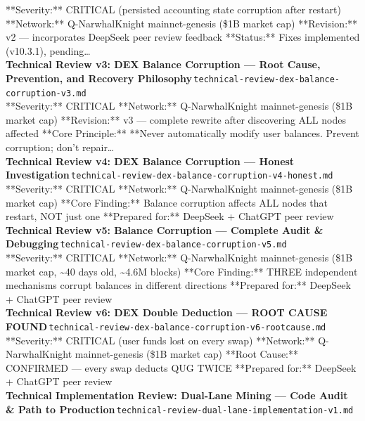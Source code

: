 \documentclass[11pt,a4paper]{article}
\begin{document}
**Severity:** CRITICAL (persisted accounting state corruption after restart) **Network:** Q-NarwhalKnight mainnet-genesis (\$1B market cap) **Revision:** v2 --- incorporates DeepSeek peer review feedback **Status:** Fixes implemented (v10.3.1), pending\ldots{}\\[6pt]
\noindent\textbf{Technical Review v3: DEX Balance Corruption --- Root Cause, Prevention, and Recovery Philosophy}\,\textcolor{qgray}{\small \texttt{technical-review-dex-balance-corruption-v3.md}}\\
**Severity:** CRITICAL **Network:** Q-NarwhalKnight mainnet-genesis (\$1B market cap) **Revision:** v3 --- complete rewrite after discovering ALL nodes affected **Core Principle:** **Never automatically modify user balances. Prevent corruption; don't repair\ldots{}\\[6pt]
\noindent\textbf{Technical Review v4: DEX Balance Corruption --- Honest Investigation}\,\textcolor{qgray}{\small \texttt{technical-review-dex-balance-corruption-v4-honest.md}}\\
**Severity:** CRITICAL **Network:** Q-NarwhalKnight mainnet-genesis (\$1B market cap) **Core Finding:** Balance corruption affects ALL nodes that restart, NOT just one **Prepared for:** DeepSeek + ChatGPT peer review\\[6pt]
\noindent\textbf{Technical Review v5: Balance Corruption --- Complete Audit \& Debugging}\,\textcolor{qgray}{\small \texttt{technical-review-dex-balance-corruption-v5.md}}\\
**Severity:** CRITICAL **Network:** Q-NarwhalKnight mainnet-genesis (\$1B market cap, \textasciitilde{}40 days old, \textasciitilde{}4.6M blocks) **Core Finding:** THREE independent mechanisms corrupt balances in different directions **Prepared for:** DeepSeek + ChatGPT peer review\\[6pt]
\noindent\textbf{Technical Review v6: DEX Double Deduction --- ROOT CAUSE FOUND}\,\textcolor{qgray}{\small \texttt{technical-review-dex-balance-corruption-v6-rootcause.md}}\\
**Severity:** CRITICAL (user funds lost on every swap) **Network:** Q-NarwhalKnight mainnet-genesis (\$1B market cap) **Root Cause:** CONFIRMED --- every swap deducts QUG TWICE **Prepared for:** DeepSeek + ChatGPT peer review\\[6pt]
\noindent\textbf{Technical Implementation Review: Dual-Lane Mining --- Code Audit \& Path to Production}\,\textcolor{qgray}{\small \texttt{technical-review-dual-lane-implementation-v1.md}}\\
\end{document}
